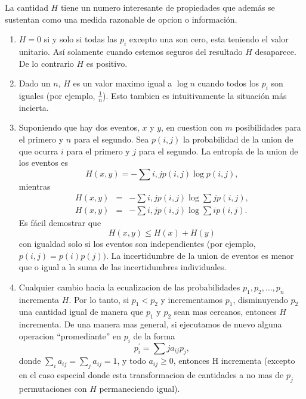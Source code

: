 La cantidad $H$ tiene un numero interesante de propiedades que
adem\'{a}s se sustentan como una medida razonable de opcion o
informaci\'{o}n.
\begin{enumerate}
\item{$H = 0$ si y solo si todas las $p_{i}$ excepto una son cero,
  esta teniendo el valor unitario. As\'{i} solamente cuando estemos
  seguros del resultado $H$ desaparece. De lo contrario $H$ es positivo.}
\item{Dado un $n$, $H$ es un valor maximo igual a $\log n$ cuando
  todos los $p_{i}$ son iguales (por ejemplo, $\frac{1}{n}$). Esto
  tambien es intuitivamente la situaci\'{o}n m\'{a}s incierta.}
\item{Suponiendo que hay dos eventos, $x$ y $y$, en cuestion con $m$
  posibilidades para el primero y $n$ para el segundo. Sea $p(i,j)$ la
  probabilidad de la union de que ocurra $i$ para el primero y $j$
  para el segundo. La entrop\'{i}a de la union de los eventos es
  \begin{equation}
    H(x,y) = -\sum{i,j} p(i,j)\log p(i,j),
  \end{equation}
  mientras
  \begin{equation}
    \begin{array}{rcl}
      H(x,y) &=& -\sum{i,j} p(i,j)\log\sum{j}{}p(i,j), \\
      H(x,y) &=& -\sum{i,j} p(i,j)\log\sum{i}{}p(i,j).
    \end{array}
  \end{equation}
  Es f\'{a}cil demostrar que
  \begin{equation}
    H(x,y) \leq H(x) + H(y)
  \end{equation}
  con igualdad solo si los eventos son independientes (por ejemplo,
  $p(i,j) = p(i)p(j))$. La incertidumbre de la union de eventos es menor que o
  igual a la suma de las incertidumbres individuales.}
\item{Cualquier cambio hacia la ecualizacion de las probabilidades
  $p_{1}, p_{2}, \ldots, p_{n}$ incrementa $H$. Por lo tanto, si
  $p_{1} < p_{2}$ y incrementamos $p_{1}$, disminuyendo $p_{2}$ una
  cantidad igual de manera que $p_{1}$ y $p_{2}$ sean mas cercanos,
  entonces $H$ incrementa. De una manera mas general, si ejecutamos de
  nuevo alguna operacion ``promediante'' en $p_{i}$ de la forma
  \begin{equation}
    p^{'}_{i} = \sum{j} a_{ij}p_{j},
  \end{equation}
  donde $\sum_{i} a_{ij} = \sum_{j} a_{ij} = 1$, y todo $a_{ij} \geq 0$, entonces H incrementa (excepto en el caso especial donde esta transformacion de cantidades a no mas de $p_{j}$ permutaciones con $H$ permaneciendo igual).}

\end{enumerate}
